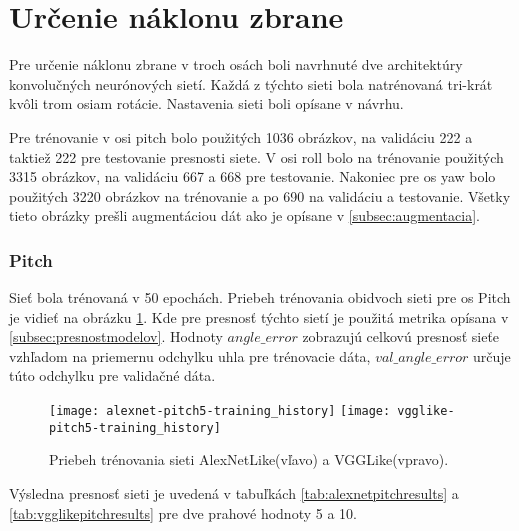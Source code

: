 
\section{Určenie náklonu zbrane}
Pre určenie náklonu zbrane v troch osách boli navrhnuté dve architektúry konvolučných neurónových sietí.
Každá z týchto sieti bola natrénovaná tri-krát kvôli trom osiam rotácie.
Nastavenia sieti boli opísane v návrhu.

Pre trénovanie v osi pitch bolo použitých 1036 obrázkov, na validáciu 222 a taktiež 222 pre testovanie presnosti siete.
V osi roll bolo na trénovanie použitých 3315 obrázkov, na validáciu 667 a 668 pre testovanie.
Nakoniec pre os yaw bolo použitých 3220 obrázkov na trénovanie a po 690 na validáciu a testovanie.
Všetky tieto obrázky prešli augmentáciou dát ako je opísane v \ref{subsec:augmentacia}.

\subsubsection{Pitch}
Sieť bola trénovaná v 50 epochách.
Priebeh trénovania obidvoch sieti pre os Pitch je vidieť na obrázku \ref{pic:pitchaxis}.
Kde pre presnosť týchto sietí je použitá metrika opísana v \ref{subsec:presnostmodelov}.
Hodnoty $angle\_error$ zobrazujú celkovú presnosť sieťe vzhľadom na priemernu odchylku uhla pre trénovacie dáta,
    $val\_angle\_error$ určuje túto odchylku pre validačné dáta.

\begin{figure}[H]
    \centering
    \texttt{[image: alexnet-pitch5-training\_history]}
	\texttt{[image: vgglike-pitch5-training\_history]}
	\caption{Priebeh trénovania sieti AlexNetLike(vľavo) a VGGLike(vpravo).}
	\label{pic:pitchaxis}
\end{figure}

Výsledna presnosť sieti je uvedená v tabuľkách \ref{tab:alexnetpitchresults} a \ref{tab:vgglikepitchresults} pre dve prahové hodnoty 5 a 10.

